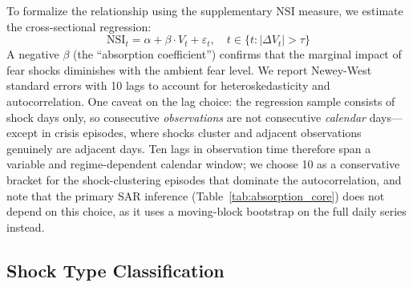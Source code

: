 \documentclass[12pt,a4paper]{article}
\begin{document}
To formalize the relationship using the supplementary NSI measure, we estimate the cross-sectional regression:
\begin{equation}
\text{NSI}_t = \alpha + \beta \cdot V_t + \varepsilon_t, \quad t \in \{t : |\Delta V_t| > \tau\}
\label{eq:absorption_reg}
\end{equation}
A negative $\beta$ (the ``absorption coefficient'') confirms that the marginal impact of fear shocks diminishes with the ambient fear level. We report Newey-West standard errors with 10 lags to account for heteroskedasticity and autocorrelation. One caveat on the lag choice: the regression sample consists of shock days only, so consecutive \textit{observations} are not consecutive \textit{calendar} days---except in crisis episodes, where shocks cluster and adjacent observations genuinely are adjacent days. Ten lags in observation time therefore span a variable and regime-dependent calendar window; we choose 10 as a conservative bracket for the shock-clustering episodes that dominate the autocorrelation, and note that the primary SAR inference (Table~\ref{tab:absorption_core}) does not depend on this choice, as it uses a moving-block bootstrap on the full daily series instead.

\subsection{Shock Type Classification}
\end{document}
